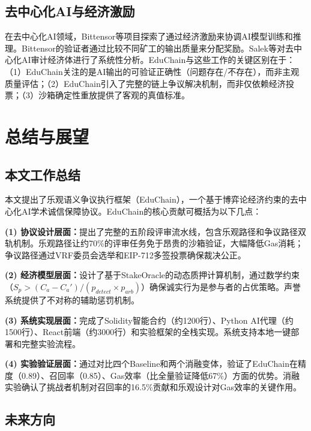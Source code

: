 \documentclass[10.5pt,compsoc]{CjC}
\begin{document}
\subsection{去中心化AI与经济激励}

在去中心化AI领域，Bittensor\cite{bittensor2023}等项目探索了通过经济激励来协调AI模型训练和推理。Bittensor的验证者通过比较不同矿工的输出质量来分配奖励。Salek等\cite{salek2024}对去中心化AI审计经济体进行了系统性分析。EduChain与这些工作的关键区别在于：（1）EduChain关注的是AI输出的可验证正确性（问题存在/不存在），而非主观质量评估；（2）EduChain引入了完整的链上争议解决机制，而非仅依赖经济投票；（3）沙箱确定性重放提供了客观的真值标准。

\section{总结与展望}

\subsection{本文工作总结}

本文提出了乐观语义争议执行框架（EduChain），一个基于博弈论经济约束的去中心化AI学术诚信保障协议。EduChain的核心贡献可概括为以下几点：

\textbf{(1) 协议设计层面：}提出了完整的五阶段评审流水线，包含乐观路径和争议路径双轨机制。乐观路径让约70\%的评审任务免于昂贵的沙箱验证，大幅降低Gas消耗；争议路径通过VRF委员会选举和EIP-712多签投票确保裁决公正。

\textbf{(2) 经济模型层面：}设计了基于StakeOracle的动态质押计算机制，通过数学约束（$S_p > (C_a - C_a')/(p_{detect} \times p_{arb})$）确保诚实行为是参与者的占优策略。声誉系统提供了不对称的辅助惩罚机制。

\textbf{(3) 系统实现层面：}完成了Solidity智能合约（约1200行）、Python AI代理（约1500行）、React前端（约3000行）和实验框架的全栈实现。系统支持本地一键部署和完整实验流程。

\textbf{(4) 实验验证层面：}通过对比四个Baseline和两个消融变体，验证了EduChain在精度（0.89）、召回率（0.85）、Gas效率（比全量验证降低67\%）方面的优势。消融实验确认了挑战者机制对召回率的16.5\%贡献和乐观设计对Gas效率的关键作用。

\subsection{未来方向}
\end{document}
